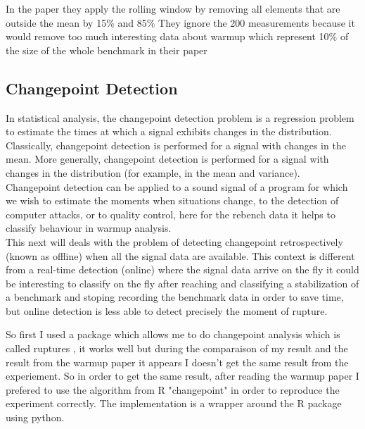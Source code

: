 \documentclass{article}
\begin{document}
In the paper they apply the rolling window by removing all elements that are outside the mean by 15\% and 85\% They ignore the 200 measurements because it would remove too much interesting data about warmup which represent 10\% of the size of the whole benchmark in their paper


\subsection{Changepoint Detection}
In statistical analysis,  the changepoint detection problem is a regression problem to estimate the times at which a signal exhibits changes in the distribution. Classically, changepoint detection is performed for a signal with changes in the mean. More generally, changepoint detection is performed for a signal with changes in the distribution (for example, in the mean and variance). \\

Changepoint detection can be applied to a sound signal of a program for which we wish to estimate the moments when situations change, to the detection of computer attacks, or to quality control, here for the rebench data it helps to classify behaviour in warmup analysis. \\

This next will deals with the problem of detecting changepoint retrospectively (known as offline) when all the signal data are available. This context is different from a real-time detection (online) where the signal data arrive on the fly it could be interesting to classify on the fly after reaching and classifying a stabilization of a benchmark and stoping recording the benchmark data in order to save time, but online detection is less able to detect precisely the moment of rupture.

So first I used a package which allows me to do changepoint analysis which is called ruptures \citep{truong2020selective}, it works well but during the comparaison of my result and the result from the warmup paper it appears I doesn't get the same result from the experiement. So in order to get the same result, after reading the warmup paper I prefered to use the algorithm from R "changepoint" \citep{killick2014changepoint} in order to reproduce the experiment correctly. The implementation is a wrapper around the R package using python. 
\end{document}
